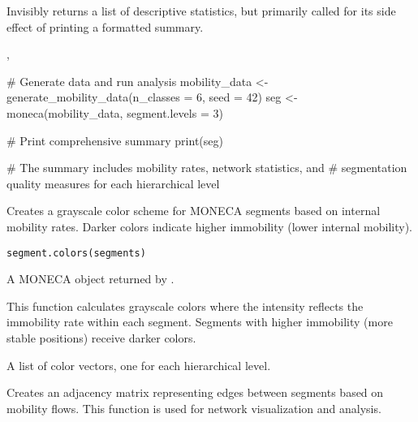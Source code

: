 \documentclass[a4paper]{book}
\begin{document}
%
\begin{Value}
Invisibly returns a list of descriptive statistics, but primarily called
for its side effect of printing a formatted summary.
\end{Value}
%
\begin{SeeAlso}
, 
\end{SeeAlso}
%
\begin{Examples}
\begin{ExampleCode}
# Generate data and run analysis
mobility_data <- generate_mobility_data(n_classes = 6, seed = 42)
seg <- moneca(mobility_data, segment.levels = 3)

# Print comprehensive summary
print(seg)

# The summary includes mobility rates, network statistics, and
# segmentation quality measures for each hierarchical level

\end{ExampleCode}
\end{Examples}
%
\begin{Description}
Creates a grayscale color scheme for MONECA segments based on internal
mobility rates. Darker colors indicate higher immobility (lower internal mobility).
\end{Description}
%
\begin{Usage}
\begin{verbatim}
segment.colors(segments)
\end{verbatim}
\end{Usage}
%
\begin{Arguments}
\begin{ldescription}
\item[\code{segments}] A MONECA object returned by .
\end{ldescription}
\end{Arguments}
%
\begin{Details}
This function calculates grayscale colors where the intensity reflects
the immobility rate within each segment. Segments with higher immobility
(more stable positions) receive darker colors.
\end{Details}
%
\begin{Value}
A list of color vectors, one for each hierarchical level.
\end{Value}
%
\begin{Description}
Creates an adjacency matrix representing edges between segments based on
mobility flows. This function is used for network visualization and analysis.
\end{Description}
\end{document}
